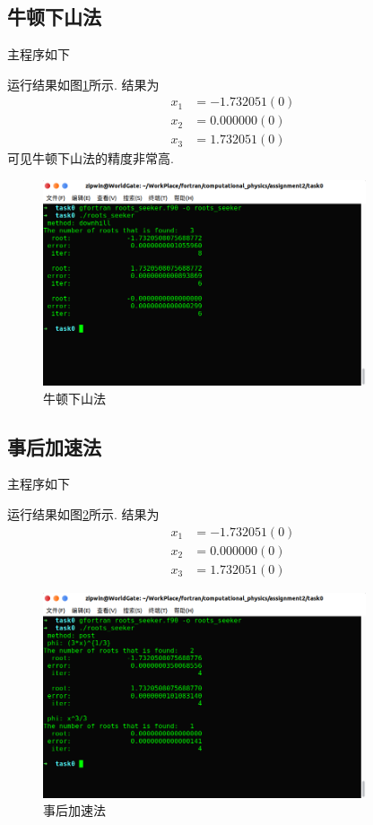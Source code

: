 \documentclass{article}
\begin{document}
	\subsection{牛顿下山法}
	主程序如下
	
	运行结果如图\ref{fig:rtr_downhill}所示. 结果为
	\[
	\begin{split}
	x_1&=-1.732051(0) \\
	x_2&=0.000000(0) \\
	x_3&=1.732051(0)
	\end{split}
	\]
	可见牛顿下山法的精度非常高.
	\begin{figure}[htb]
		\centering
		\includegraphics[width=0.85\textwidth]{./utils/rtr_downhill.png}
		\caption{ 牛顿下山法\label{fig:rtr_downhill}}
	\end{figure}
	
	\subsection{事后加速法}
	主程序如下
	
	运行结果如图\ref{fig:rtr_post}所示. 结果为
	\[
	\begin{split}
	x_1&=-1.732051(0) \\
	x_2&=0.000000(0) \\
	x_3&=1.732051(0)
	\end{split}
	\]
	\begin{figure}[htb]
		\centering
		\includegraphics[width=0.85\textwidth]{./utils/rtr_post.png}
		\caption{ 事后加速法\label{fig:rtr_post}}
	\end{figure}
	
\end{document}
